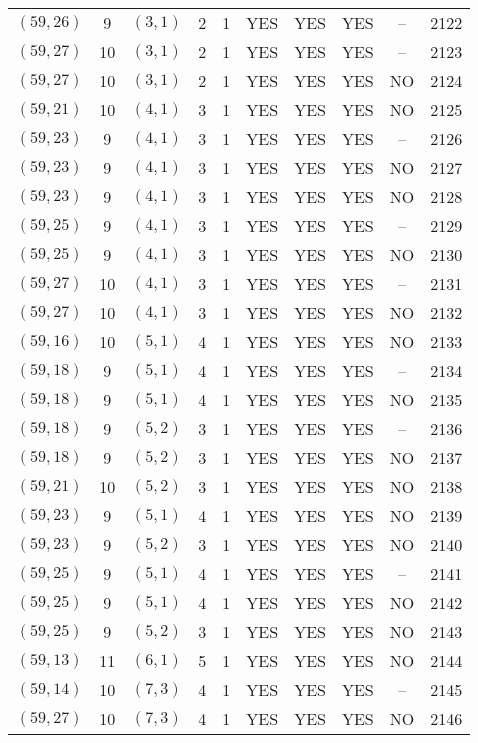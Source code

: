 \begin{longtable}{|c|c|c|c|c|c|c|c|c|c|}
$(59, 26)$ & 9 & $(3, 1)$ & 2 & 1 & YES & YES & YES & -- & 2122\\
$(59, 27)$ & 10 & $(3, 1)$ & 2 & 1 & YES & YES & YES & -- & 2123\\
$(59, 27)$ & 10 & $(3, 1)$ & 2 & 1 & YES & YES & YES & NO & 2124\\
$(59, 21)$ & 10 & $(4, 1)$ & 3 & 1 & YES & YES & YES & NO & 2125\\
$(59, 23)$ & 9 & $(4, 1)$ & 3 & 1 & YES & YES & YES & -- & 2126\\
$(59, 23)$ & 9 & $(4, 1)$ & 3 & 1 & YES & YES & YES & NO & 2127\\
$(59, 23)$ & 9 & $(4, 1)$ & 3 & 1 & YES & YES & YES & NO & 2128\\
$(59, 25)$ & 9 & $(4, 1)$ & 3 & 1 & YES & YES & YES & -- & 2129\\
$(59, 25)$ & 9 & $(4, 1)$ & 3 & 1 & YES & YES & YES & NO & 2130\\
$(59, 27)$ & 10 & $(4, 1)$ & 3 & 1 & YES & YES & YES & -- & 2131\\
$(59, 27)$ & 10 & $(4, 1)$ & 3 & 1 & YES & YES & YES & NO & 2132\\
$(59, 16)$ & 10 & $(5, 1)$ & 4 & 1 & YES & YES & YES & NO & 2133\\
$(59, 18)$ & 9 & $(5, 1)$ & 4 & 1 & YES & YES & YES & -- & 2134\\
$(59, 18)$ & 9 & $(5, 1)$ & 4 & 1 & YES & YES & YES & NO & 2135\\
$(59, 18)$ & 9 & $(5, 2)$ & 3 & 1 & YES & YES & YES & -- & 2136\\
$(59, 18)$ & 9 & $(5, 2)$ & 3 & 1 & YES & YES & YES & NO & 2137\\
$(59, 21)$ & 10 & $(5, 2)$ & 3 & 1 & YES & YES & YES & NO & 2138\\
$(59, 23)$ & 9 & $(5, 1)$ & 4 & 1 & YES & YES & YES & NO & 2139\\
$(59, 23)$ & 9 & $(5, 2)$ & 3 & 1 & YES & YES & YES & NO & 2140\\
$(59, 25)$ & 9 & $(5, 1)$ & 4 & 1 & YES & YES & YES & -- & 2141\\
$(59, 25)$ & 9 & $(5, 1)$ & 4 & 1 & YES & YES & YES & NO & 2142\\
$(59, 25)$ & 9 & $(5, 2)$ & 3 & 1 & YES & YES & YES & NO & 2143\\
$(59, 13)$ & 11 & $(6, 1)$ & 5 & 1 & YES & YES & YES & NO & 2144\\
$(59, 14)$ & 10 & $(7, 3)$ & 4 & 1 & YES & YES & YES & -- & 2145\\
$(59, 27)$ & 10 & $(7, 3)$ & 4 & 1 & YES & YES & YES & NO & 2146\\

\end{longtable}
